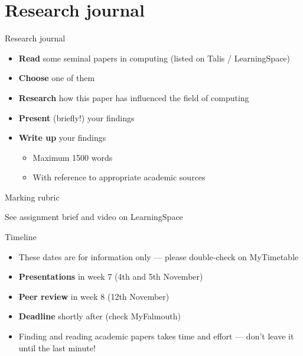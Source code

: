 \part{Research journal}
\frame{\partpage}

\begin{frame}{Research journal}
    \begin{itemize}
        \pause\item \textbf{Read} some seminal papers in computing (listed on Talis / LearningSpace)
        \pause\item \textbf{Choose} one of them
        \pause\item \textbf{Research} how this paper has influenced the field of computing
		\pause\item \textbf{Present} (briefly!) your findings
        \pause\item \textbf{Write up} your findings
        \begin{itemize}
            \pause\item Maximum 1500 words
            \pause\item With reference to appropriate academic sources
        \end{itemize}
    \end{itemize}
\end{frame}

\begin{frame}{Marking rubric}
    \begin{center}
        See assignment brief and video on LearningSpace
    \end{center}
\end{frame}

\begin{frame}{Timeline}
    \begin{itemize}
        \pause\item These dates are for information only --- please double-check on MyTimetable
        \pause\item \textbf{Presentations} in week 7 (4th and 5th November)
        \pause\item \textbf{Peer review} in week 8 (12th November)
        \pause\item \textbf{Deadline} shortly after (check MyFalmouth)
        \pause\item Finding and reading academic papers takes time and effort --- don't leave it until the last minute!
    \end{itemize}
\end{frame}

